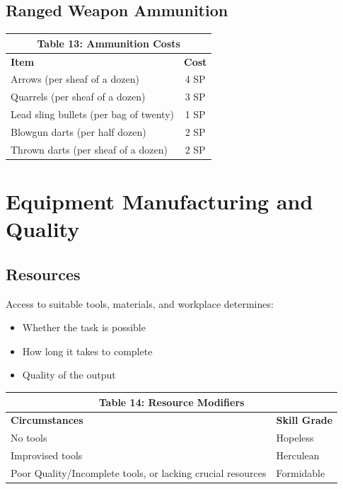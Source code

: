 \documentclass[10pt]{article}
\begin{document}
\subsection{Ranged Weapon Ammunition}
\label{sec:ammunition}

\begin{longtable}[c]{|l|c|}
\hline
\multicolumn{2}{|c|}{\textbf{Table 13: Ammunition Costs}} \\
\hline
\textbf{Item} & \textbf{Cost} \\
\hline
Arrows (per sheaf of a dozen) & 4 SP \\
\hline
Quarrels (per sheaf of a dozen) & 3 SP \\
\hline
Lead sling bullets (per bag of twenty) & 1 SP \\
\hline
Blowgun darts (per half dozen) & 2 SP \\
\hline
Thrown darts (per sheaf of a dozen) & 2 SP \\
\hline
\end{longtable}

\section{Equipment Manufacturing and Quality}
\label{sec:manufacturing}

\subsection{Resources}
\label{sec:resources}

Access to suitable tools, materials, and workplace determines:
\begin{itemize}
    \item Whether the task is possible
    \item How long it takes to complete
    \item Quality of the output
\end{itemize}

\begin{longtable}[c]{|l|l|}
\hline
\multicolumn{2}{|c|}{\textbf{Table 14: Resource Modifiers}} \\
\hline
\textbf{Circumstances} & \textbf{Skill Grade} \\
\hline
No tools & Hopeless \\
\hline
Improvised tools & Herculean \\
\hline
Poor Quality/Incomplete tools, or lacking crucial resources & Formidable \\
\hline
\end{longtable}
\end{document}

